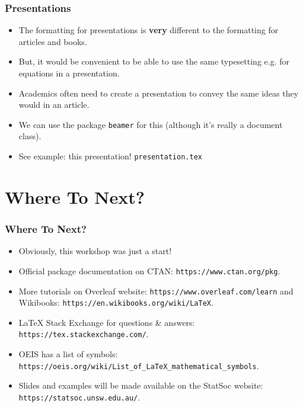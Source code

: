 \documentclass{beamer}
\begin{document}
\begin{frame}
	\frametitle{Presentations}
	\begin{itemize}
		\item The formatting for presentations is \textbf{very} different to the formatting for articles and books.
		\item But, it would be convenient to be able to use the same typesetting e.g. for equations in a presentation.
		\item Academics often need to create a presentation to convey the same ideas they would in an article.
		\item We can use the package \texttt{beamer} for this (although it's really a document class).
		\item See example: this presentation! \texttt{presentation.tex}
	\end{itemize}
\end{frame}

\section{Where To Next?}

\begin{frame}
	\frametitle{Where To Next?}
	\begin{itemize}
		\item Obviously, this workshop was just a start!
		\item Official package documentation on CTAN: \texttt{https://www.ctan.org/pkg}.
		\item More tutorials on Overleaf website: \texttt{https://www.overleaf.com/learn} and Wikibooks: \texttt{https://en.wikibooks.org/wiki/LaTeX}.
		\item \LaTeX{} Stack Exchange for questions \& answers: \texttt{https://tex.stackexchange.com/}.
		\item OEIS has a list of symbols: \texttt{https://oeis.org/wiki/List\_of\_LaTeX\_mathematical\_symbols}.
		\item Slides and examples will be made available on the StatSoc website: \texttt{https://statsoc.unsw.edu.au/}.
	\end{itemize}
\end{frame}
\end{document}
